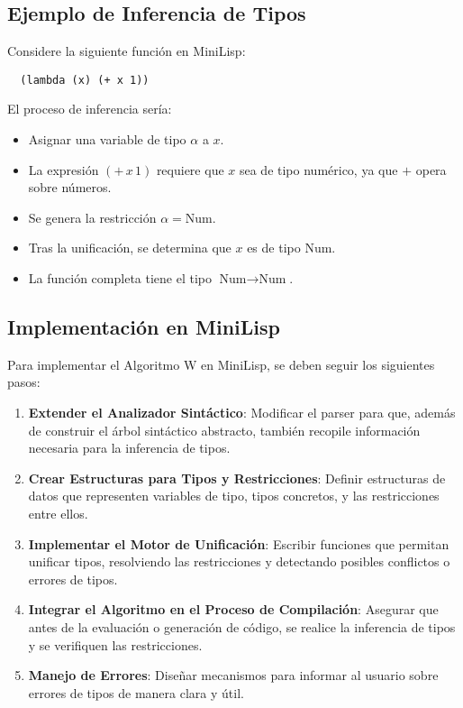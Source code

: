 \documentclass{article}
\begin{document}
  \subsection{Ejemplo de Inferencia de Tipos}

  Considere la siguiente función en MiniLisp:

  \begin{lstlisting}
  (lambda (x) (+ x 1))
  \end{lstlisting}

  El proceso de inferencia sería:

  \begin{itemize}
    \item Asignar una variable de tipo $\alpha$ a $x$.

    \item La expresión $(+\, x\, 1)$ requiere que $x$ sea de tipo numérico, ya que $+$ opera sobre números.

    \item Se genera la restricción $\alpha = \text{Num}$.

    \item Tras la unificación, se determina que $x$ es de tipo $\text{Num}$.

    \item La función completa tiene el tipo $\text{Num} \rightarrow \text{Num}$.
  \end{itemize}

  \subsection{Implementación en MiniLisp}

  Para implementar el Algoritmo W en MiniLisp, se deben seguir los siguientes pasos:

  \begin{enumerate}
    \item \textbf{Extender el Analizador Sintáctico}: Modificar el parser para que, además de construir el árbol sintáctico abstracto, también recopile información necesaria para la inferencia de tipos.

    \item \textbf{Crear Estructuras para Tipos y Restricciones}: Definir estructuras de datos que representen variables de tipo, tipos concretos, y las restricciones entre ellos.

    \item \textbf{Implementar el Motor de Unificación}: Escribir funciones que permitan unificar tipos, resolviendo las restricciones y detectando posibles conflictos o errores de tipos.

    \item \textbf{Integrar el Algoritmo en el Proceso de Compilación}: Asegurar que antes de la evaluación o generación de código, se realice la inferencia de tipos y se verifiquen las restricciones.

    \item \textbf{Manejo de Errores}: Diseñar mecanismos para informar al usuario sobre errores de tipos de manera clara y útil.
  \end{enumerate}
\end{document}
